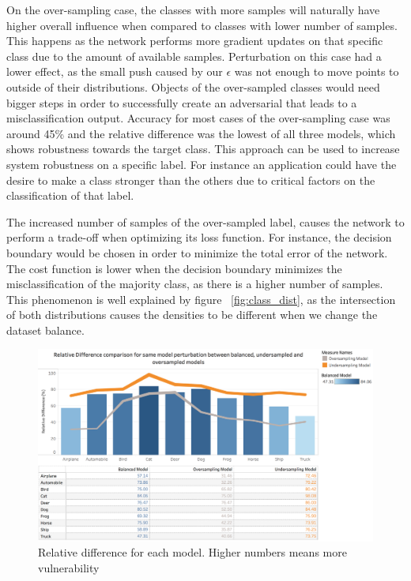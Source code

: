 On the over-sampling case, the classes with more samples will naturally have higher overall influence when compared to classes with lower number of samples. This happens as the network performs more gradient updates on that specific class due to the amount of available samples. Perturbation on this case had a lower effect, as the small push caused by our $\epsilon$ was not enough to move points to outside of their distributions. Objects of the over-sampled classes would need bigger steps in order to successfully create an adversarial that leads to a misclassification output. Accuracy for most cases of the over-sampling case was around 45\% and the relative difference was the lowest of all three models, which shows robustness towards the target class. This approach can be used to increase system robustness on a specific label. For instance an application could have the desire to make a class stronger than the others due to critical factors on the classification of that label.

The increased number of samples of the over-sampled label, causes the network to perform a trade-off when optimizing its loss function. For instance, the decision boundary would be chosen in order to minimize the total error of the network. The cost function is lower when the decision boundary minimizes the misclassification of the majority class, as there is a higher number of samples. This phenomenon is well explained by figure ~\ref{fig:class_dist}, as the intersection of both distributions causes the densities to be different when we change the dataset balance.

\begin{figure}[H]
	\centering
	\includegraphics[scale=0.3]{rel_diff_graph.png}
	\caption{Relative difference for each model. Higher numbers means more vulnerability}
	\label{fig:relative_difference}
\end{figure}

